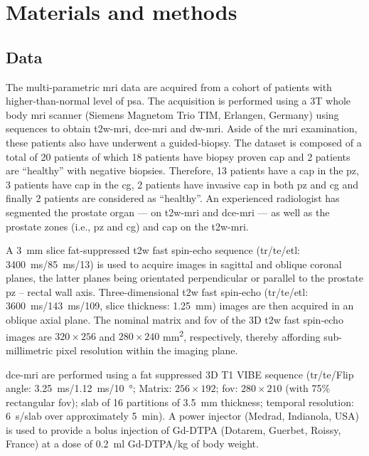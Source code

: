 \section{Materials and methods}\label{sec:methods}

\subsection{Data}\label{sec:data}


The multi-parametric \ac{mri} data are acquired from a cohort of patients with higher-than-normal level of \ac{psa}.
The acquisition is performed using a 3T whole body \ac{mri} scanner (Siemens Magnetom Trio TIM, Erlangen, Germany) using sequences to obtain \ac{t2w}-\ac{mri}, \ac{dce}-\ac{mri} and \ac{dw}-\ac{mri}.
Aside of the \ac{mri} examination, these patients also have underwent a guided-biopsy.
The dataset is composed of a total of 20 patients of which 18 patients have biopsy proven \ac{cap} and 2 patients are ``healthy'' with negative biopsies.
Therefore, 13 patients have a \ac{cap} in the \ac{pz}, 3 patients have \ac{cap} in the \ac{cg}, 2 patients have invasive \ac{cap} in both \ac{pz} and \ac{cg} and finally 2 patients are considered as ``healthy''.
An experienced radiologist has segmented the prostate organ --- on \ac{t2w}-\ac{mri} and \ac{dce}-\ac{mri} --- as well as the prostate zones (i.e., \ac{pz} and \ac{cg}) and \ac{cap} on the \ac{t2w}-\ac{mri}.

A \SI{3}{\mm} slice fat-suppressed \ac{t2w} fast spin-echo sequence (\ac{tr}/\ac{te}/\ac{etl}: \SI{3400}{\ms}/\SI{85}{\ms}/13) is used to acquire images in sagittal and oblique coronal planes, the latter planes being orientated perpendicular or parallel to the prostate \ac{pz} – rectal wall axis.
Three-dimensional \ac{t2w} fast spin-echo (\ac{tr}/\ac{te}/\ac{etl}: \SI{3600}{\ms}/\SI{143}{\ms}/109, slice thickness: \SI{1.25}{\mm}) images are then acquired in an oblique axial plane.
The nominal matrix and \ac{fov} of the 3D \ac{t2w} fast spin-echo images are $320 \times 256$ and $280 \times 240$ mm\textsuperscript{2}, respectively, thereby affording sub-millimetric pixel resolution within the imaging plane.

\ac{dce}-\ac{mri} are performed using a fat suppressed 3D T1 VIBE sequence (\ac{tr}/\ac{te}/Flip angle: \SI{3.25}{\ms}/\SI{1.12}{\ms}/\SI{10}{\degree}; Matrix: $256 \times 192$; \ac{fov}: $280 \times 210$ (with 75\% rectangular \ac{fov}); slab of 16 partitions of \SI{3.5}{\mm} thickness; temporal resolution: \SI{6}{\s}/slab over approximately \SI{5}{\minute}).
A power injector (Medrad, Indianola, USA) is used to provide a bolus injection of Gd-DTPA (Dotarem, Guerbet, Roissy, France) at a dose of \SI{0.2}{\ml} Gd-DTPA/kg of body weight.

